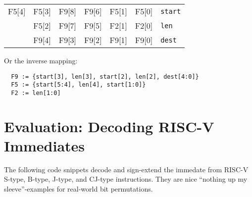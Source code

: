 \begin{center}
\begin{tabular}{c|c|c|c|c|c|l}
\cline{1-6}
\multicolumn{1}{|c|}{F5[4]} & F5[3] & F9[8] & F9[6] & F5[1] & F5[0] & {\tt start} \\
\cline{1-6}
                            & F5[2] & F9[7] & F9[5] & F2[1] & F2[0] & {\tt len} \\
\cline{2-6}
                            & F9[4] & F9[3] & F9[2] & F9[1] & F9[0] & {\tt dest} \\
\cline{2-6}
\end{tabular}
\end{center}

Or the inverse mapping:

\begin{verbatim}
  F9 := {start[3], len[3], start[2], len[2], dest[4:0]}
  F5 := {start[5:4], len[4], start[1:0]}
  F2 := len[1:0]
\end{verbatim}

\section{Evaluation: Decoding RISC-V Immediates}

The following code snippets decode and sign-extend the immedate from RISC-V
S-type, B-type, J-type, and CJ-type instructions. They are nice ``nothing up my
sleeve''-examples for real-world bit permutations.

